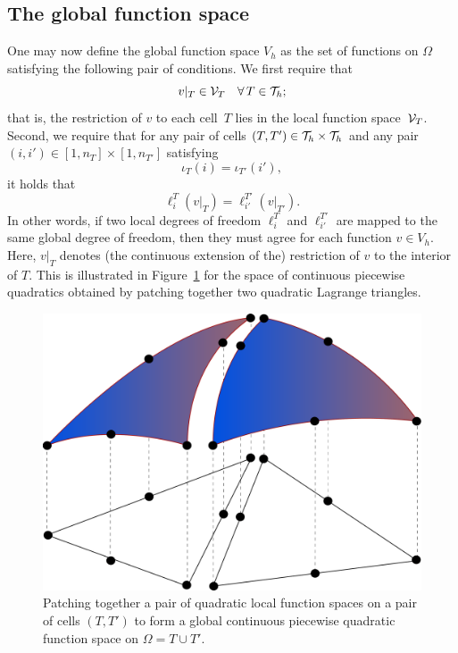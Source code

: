 \subsection{The global function space}

One may now define the global function space $V_h$ as the set of
functions on $\Omega$ satisfying the following pair of conditions. We
first require that
\begin{equation}
  v |_T \in \mathcal{V}_T \quad \forall\, T \in \mathcal{T}_h;
\end{equation}
that is, the restriction of $v$ to each cell~$T$ lies in the local
function space~$\mathcal{V}_T$. Second, we require that for any pair
of cells $(T, T') \in \mathcal{T}_h \times \mathcal{T}_h$ and any pair~$(i, i') \in
[1,n_T] \times [1,n_{T'}]$ satisfying
\begin{equation}
  \iota_T(i) = \iota_{T'}(i'),
\end{equation}
it holds that
\begin{equation} \label{eq:constraint}
  \ell^T_i(v|_T) = \ell^{T'}_{i'}(v|_{T'}).
\end{equation}
In other words, if two local degrees of freedom $\ell_i^T$ and
$\ell^{T'}_{i'}$ are mapped to the same global degree of freedom, then
they must agree for each function $v \in V_h$. Here, $v|_T$ denotes
(the continuous extension of the) restriction of $v$ to the interior
of $T$. This is illustrated in Figure~\ref{fig:femspace} for the space
of continuous piecewise quadratics obtained by patching together two
quadratic Lagrange triangles.

\begin{figure}
  \centering
  \includegraphics[width=\largefig]{chapters/kirby-7/pdf/femspace.pdf}
  \caption{Patching together a pair of quadratic local function
    spaces on a pair of cells $(T, T')$ to form a global continuous
    piecewise quadratic function space on $\Omega = T \cup T'$.}
  \label{fig:femspace}
\end{figure}

